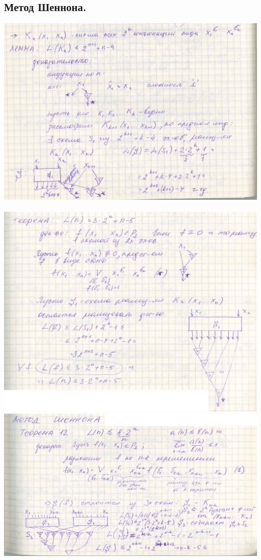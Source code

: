 \documentclass[12pt]{article}
\begin{document}
\subsection{Метод Шеннона.}
	\includegraphics[width=450pt]{29}\\\\
	\includegraphics[width=400pt]{30}\\
	\includegraphics[width=400pt]{31}\\
\end{document}
